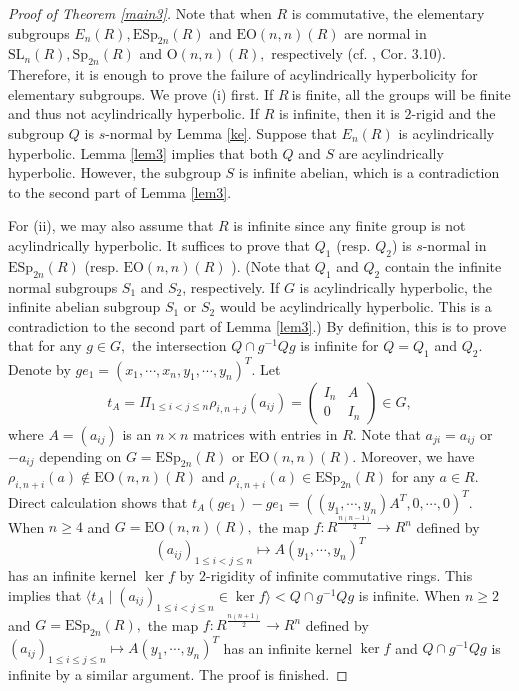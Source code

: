 \documentclass{gtpart}     %
\begin{document}
\begin{proof}[Proof of Theorem \protect\ref{main3}]
Note that when $R$ is commutative, the elementary subgroups $E_{n}(R),%
\mathrm{ESp}_{2n}(R)$ and $\mathrm{EO}(n,n)(R)$ are normal in $\mathrm{SL}%
_{n}(R),\mathrm{Sp}_{2n}(R)$ and $\mathrm{O}(n,n)(R),$ respectively (cf.
\cite{Su}, \cite{ba} Cor. 3.10). Therefore, it is enough to prove the
failure of acylindrically hyperbolicity for elementary subgroups. We prove
(i) first. If $R\ $is finite, all the groups will be finite and thus not
acylindrically hyperbolic. If $R$ is infinite, then it is $2$-rigid and the
subgroup $Q$ is $s$-normal by Lemma \ref{ke}. Suppose that $E_{n}(R)$ is
acylindrically hyperbolic. Lemma \ref{lem3} implies that both $Q$ and $S$
are acylindrically hyperbolic. However, the subgroup $S$ is infinite
abelian, which is a contradiction to the second part of Lemma \ref{lem3}.

For (ii), we may also assume that $R$ is infinite since any finite group is
not acylindrically hyperbolic. It suffices to prove that $Q_{1}$ (resp. $%
Q_{2}$) is $s$-normal in $\mathrm{ESp}_{2n}(R)$ (resp. $\mathrm{EO}(n,n)(R)$%
). (Note that $Q_{1}$ and $Q_{2}$ contain the infinite normal subgroups $%
S_{1}$ and $S_{2}$, respectively. If $G$ is acylindrically hyperbolic, the
infinite abelian subgroup $S_{1}$ or $S_{2}$ would be acylindrically
hyperbolic. This is a contradiction to the second part of Lemma \ref{lem3}.)
By definition, this is to prove that for any $g\in G,$ the intersection $%
Q\cap g^{-1}Qg$ is infinite for $Q=Q_{1}$ and $Q_{2}$. Denote by $%
ge_{1}=(x_{1},\cdots ,x_{n},y_{1},\cdots ,y_{n})^{T}.$ Let%
\begin{equation*}
t_{A}=\Pi _{1\leq i<j\leq n}\rho _{i,n+j}(a_{ij})=\left(
\begin{array}{ll}
I_{n} & A \\
0 & I_{n}%
\end{array}%
\right) \in G,
\end{equation*}%
where $A=(a_{ij})$ is an $n\times n$ matrices with entries in $R.$ Note that
$a_{ji}=a_{ij}$ or $-a_{ij}$ depending on $G=\mathrm{ESp}_{2n}(R)$ or $%
\mathrm{EO}(n,n)(R)$. Moreover, we have $\rho _{i,n+i}(a)\notin \mathrm{EO}%
(n,n)(R)$ and $\rho _{i,n+i}(a)\in \mathrm{ESp}_{2n}(R)$ for any $a\in R.$
Direct calculation shows that $t_{A}(ge_{1})-ge_{1}=((y_{1},\cdots
,y_{n})A^{T},0,\cdots ,0)^{T}.$ When $n\geq 4$ and $G=\mathrm{EO}(n,n)(R),$
the map $f:R^{\frac{n(n-1)}{2}}\rightarrow R^{n}$ defined by
\begin{equation*}
(a_{ij})_{1\leq i<j\leq n}\longmapsto A(y_{1},\cdots ,y_{n})^{T}
\end{equation*}%
has an infinite kernel $\ker f$ by $2$-rigidity of infinite commutative
rings. This implies that $\langle t_{A}\mid (a_{ij})_{1\leq i<j\leq n}\in
\ker f\rangle <Q\cap g^{-1}Qg$ is infinite. When $n\geq 2$ and $G=\mathrm{ESp%
}_{2n}(R),$ the map $f:R^{\frac{n(n+1)}{2}}\rightarrow R^{n}$ defined by $%
(a_{ij})_{1\leq i\leq j\leq n}\longmapsto A(y_{1},\cdots ,y_{n})^{T}$ has an
infinite kernel $\ker f$ and $Q\cap g^{-1}Qg$ is infinite by a similar
argument. The proof is finished.
\end{proof}
\end{document}
